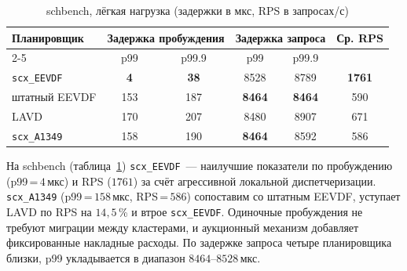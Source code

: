 \documentclass[14pt, oneside]{extbook}
\begin{document}
        \begin{table}[H]
                \centering
                \caption{schbench, лёгкая нагрузка (задержки в мкс, RPS в запросах/с)}
                \label{tab:light_schbench}
                \vspace{0.4em}
                \begin{tabular}{|l|c|c|c|c|c|}
                        \hline
                        \multirow{2}{*}{Планировщик}
                                & \multicolumn{2}{c|}{Задержка пробуждения}
                                & \multicolumn{2}{c|}{Задержка запроса}
                                & \multirow{2}{*}{Ср. RPS} \\
                        \cline{2-5}
                                & p99 & p99.9 & p99 & p99.9 & \\
                        \hline
                        \texttt{scx\_EEVDF} & \textbf{4}  & \textbf{38}  & 8528          & 8789          & \textbf{1761} \\
                        штатный EEVDF       & 153         & 187          & \textbf{8464} & \textbf{8464} & 590 \\
                        LAVD                & 170         & 207          & 8480          & 8907          & 671 \\
                        \texttt{scx\_A1349} & 158         & 190          & \textbf{8464} & 8592          & 586 \\
                        \hline
                \end{tabular}
        \end{table}

        На schbench (таблица~\ref{tab:light_schbench})
        \texttt{scx\_EEVDF}~--- наилучшие показатели по
        пробуждению (p99\,=\,$4$\,мкс) и RPS ($1761$) за счёт
        агрессивной локальной диспетчеризации.
        \texttt{scx\_A1349} (p99\,=\,$158$\,мкс, RPS\,=\,$586$)
        сопоставим со штатным EEVDF, уступает LAVD по RPS на
        $14{,}5$\,\% и втрое \texttt{scx\_EEVDF}. Одиночные
        пробуждения не требуют миграции между кластерами, и
        аукционный механизм добавляет фиксированные накладные
        расходы. По задержке запроса четыре планировщика
        близки, p99 укладывается в диапазон
        $8464$--$8528$\,мкс.
\end{document}
